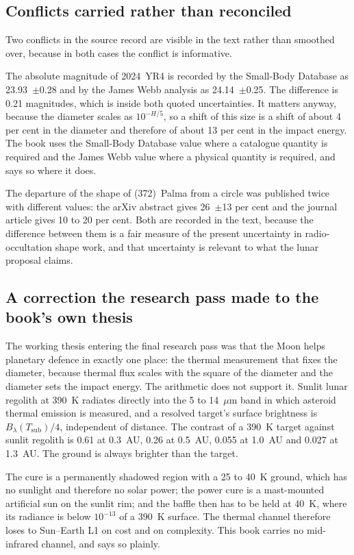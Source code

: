 \subsection*{Conflicts carried rather than reconciled}

Two conflicts in the source record are visible in the text rather than
smoothed over, because in both cases the conflict is informative.

The absolute magnitude of 2024~YR4 is recorded by the Small-Body Database as
23.93~$\pm$0.28 and by the James Webb analysis as 24.14~$\pm$0.25. The
difference is 0.21 magnitudes, which is inside both quoted uncertainties.
It matters anyway, because the diameter scales as \(10^{-H/5}\), so a shift
of this size is a shift of about 4 per cent in the diameter and therefore of
about 13 per cent in the impact energy. The book uses the Small-Body
Database value where a catalogue quantity is required and the James Webb
value where a physical quantity is required, and says so where it does.

The departure of the shape of (372)~Palma from a circle was published twice
with different values: the arXiv abstract gives 26~$\pm$13 per cent and the
journal article gives 10 to 20 per cent. Both are recorded in the text,
because the difference between them is a fair measure of the present
uncertainty in radio-occultation shape work, and that uncertainty is
relevant to what the lunar proposal claims.

\subsection*{A correction the research pass made to the book's own thesis}

The working thesis entering the final research pass was that the Moon helps
planetary defence in exactly one place: the thermal measurement that fixes
the diameter, because thermal flux scales with the square of the diameter
and the diameter sets the impact energy. The arithmetic does not support it.
Sunlit lunar regolith at 390~K radiates directly into the 5 to 14~$\mu$m band
in which asteroid thermal emission is measured, and a resolved target's
surface brightness is \(B_\lambda(T_{\mathrm{sub}})/4\), independent of
distance. The contrast of a 390~K target against sunlit regolith is
0.61 at 0.3~AU, 0.26 at 0.5~AU, 0.055 at 1.0~AU and 0.027 at 1.3~AU. The
ground is always brighter than the target.

The cure is a permanently shadowed region with a 25 to 40~K ground, which has
no sunlight and therefore no solar power; the power cure is a mast-mounted
artificial sun on the sunlit rim; and the baffle then has to be held at
40~K, where its radiance is below $10^{-13}$ of a 390~K surface. The thermal
channel therefore loses to Sun--Earth L1 on cost and on complexity. This
book carries no mid-infrared channel, and says so plainly.
\clearpage

